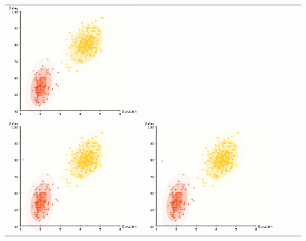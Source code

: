 \documentclass{beamer}
\begin{document}
\begin{frame}
{\begin{tabular}{ccccc}
\includegraphics[scale=0.2]{em/frame_09_delay-0}\\
\includegraphics[scale=0.2]{em/frame_10_delay-0}&
\includegraphics[scale=0.2]{em/frame_11_delay-0}&

\end{tabular}}
\end{frame}
\end{document}
